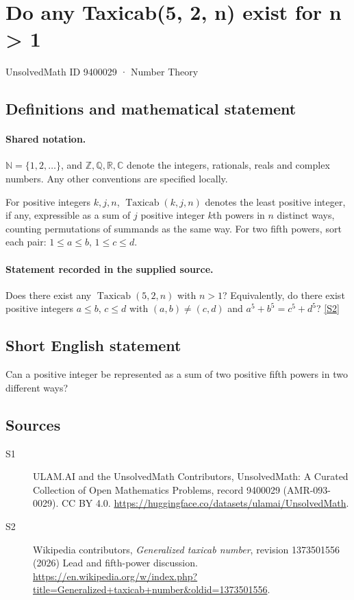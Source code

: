 \documentclass[11pt]{article}
\newcommand{\sref}[2]{\hyperlink{source:#1:#2}{[S#2]}}
\begin{document}
\setcounter{section}{9400028}
\section{Do any Taxicab(5, 2, n) exist for n > 1}\label{9400029}
{\small\sffamily UnsolvedMath ID 9400029 · Number Theory}
\subsection{Definitions and mathematical statement}

\paragraph{Shared notation.}$\mathbb N=\{1,2,\ldots\}$, and $\mathbb Z,\mathbb Q,\mathbb R,\mathbb C$ denote the integers, rationals, reals and complex numbers. Any other conventions are specified locally.


For positive integers $k,j,n$, $\operatorname{Taxicab}(k,j,n)$ denotes the least positive integer, if any, expressible as a sum of $j$ positive integer $k$th powers in $n$ distinct ways, counting permutations of summands as the same way. For two fifth powers, sort each pair: $1\le a\le b$, $1\le c\le d$.
\paragraph{Statement recorded in the supplied source.}
Does there exist any $\operatorname{Taxicab}(5,2,n)$ with $n>1$? Equivalently, do there exist positive integers $a\le b$, $c\le d$ with $(a,b)\ne(c,d)$ and $a^5+b^5=c^5+d^5$? \sref{9400029}{2}
\subsection{Short English statement}
Can a positive integer be represented as a sum of two positive fifth powers in two different ways?
\subsection{Sources}
\begin{description}
\item[\hypertarget{source:9400029:1}{S1}] ULAM.AI and the UnsolvedMath Contributors, UnsolvedMath: A Curated Collection of Open Mathematics Problems, record 9400029 (AMR-093-0029). CC BY 4.0. \url{https://huggingface.co/datasets/ulamai/UnsolvedMath}.
\item[\hypertarget{source:9400029:2}{S2}] Wikipedia contributors, \emph{Generalized taxicab number}, revision 1373501556 (2026) Lead and fifth-power discussion. \url{https://en.wikipedia.org/w/index.php?title=Generalized+taxicab+number&oldid=1373501556}.
\end{description}
\label{end:9400029}
\end{document}
